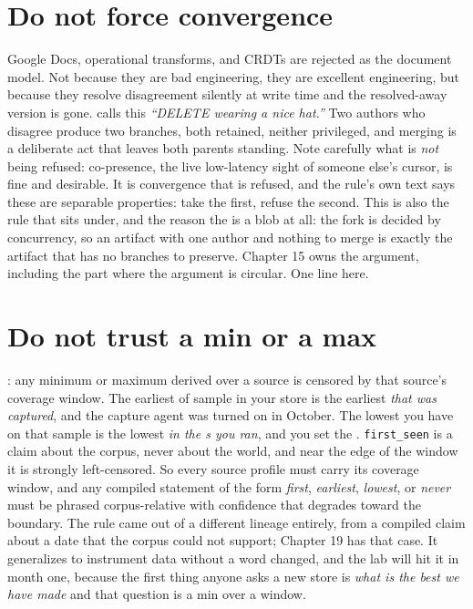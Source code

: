 \section{Do not force convergence}

Google Docs, operational transforms, and CRDTs are rejected as the document model. Not because they are bad engineering, they are excellent engineering, but because they resolve disagreement silently at write time and the resolved-away version is gone.  calls this \textit{``DELETE wearing a nice hat.''} Two authors who disagree produce two branches, both retained, neither privileged, and merging is a deliberate act that leaves both parents standing. Note carefully what is \emph{not} being refused: co-presence, the live low-latency sight of someone else's cursor, is fine and desirable. It is convergence that is refused, and the rule's own text says these are separable properties: take the first, refuse the second. This is also the rule that  sits under, and the reason the \labScan{} is a blob at all: the fork is decided by concurrency, so an artifact with one author and nothing to merge is exactly the artifact that has no branches to preserve. Chapter 15 owns the argument, including the part where the argument is circular. One line here.

\section{Do not trust a min or a max}

: any minimum or maximum derived over a source is censored by that source's coverage window. The earliest \labScan{} of sample \labSample{} in your store is the earliest \labScan{} \emph{that was captured}, and the capture agent was turned on in October. The lowest \labMeasurement{} you have on that sample is the lowest \labMeasurement{} \emph{in the \labScan{}s you ran}, and you set the \labSweepParam{}. \texttt{first\_seen} is a claim about the corpus, never about the world, and near the edge of the window it is strongly left-censored. So every source profile must carry its coverage window, and any compiled statement of the form \textit{first}, \textit{earliest}, \textit{lowest}, or \textit{never} must be phrased corpus-relative with confidence that degrades toward the boundary. The rule came out of a different lineage entirely, from a compiled claim about a date that the corpus could not support; Chapter 19 has that case. It generalizes to instrument data without a word changed, and the lab will hit it in month one, because the first thing anyone asks a new store is \textit{what is the best \labDevice{} we have made} and that question is a min over a window.

